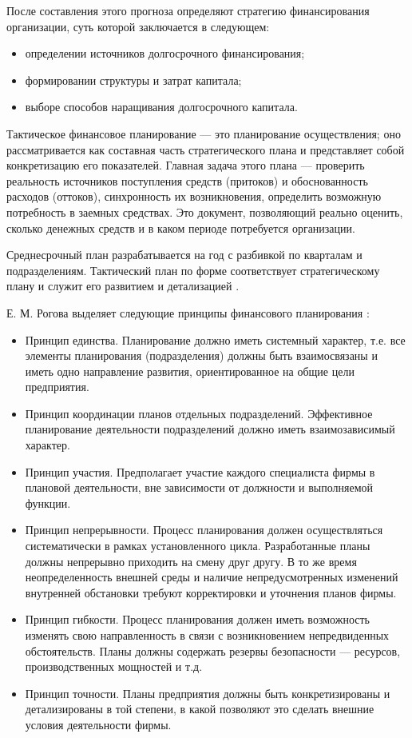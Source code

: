 После составления этого прогноза определяют стратегию финансирования организации, суть которой заключается в следующем:
\begin{itemize}
	\item определении источников долгосрочного финансирования;
	\item формировании структуры и затрат капитала;
	\item выборе способов наращивания долгосрочного капитала.
\end{itemize}

Тактическое финансовое планирование --- это планирование осуществления; оно рассматривается как составная часть стратегического плана и представляет собой конкретизацию его показателей.
Главная задача этого плана --- проверить реальность источников поступления средств (притоков) и обоснованность расходов (оттоков), синхронность их возникновения, определить возможную потребность в заемных средствах.
Это документ, позволяющий реально оценить, сколько денежных средств и в каком периоде потребуется организации.

Среднесрочный план разрабатывается на год с разбивкой по кварталам и подразделениям.
Тактический план по форме соответствует стратегическому плану и служит его развитием и детализацией \cite[179]{kirichenko}.

Е. М. Рогова выделяет следующие принципы финансового планирования \cite[70--72]{rogova}:
\begin{itemize}
	\item Принцип единства.
	Планирование должно иметь системный характер, т.е. все элементы планирования (подразделения) должны быть взаимосвязаны и иметь одно направление развития, ориентированное на общие цели предприятия.
	\item Принцип координации планов отдельных подразделений.
	Эффективное планирование деятельности подразделений должно иметь взаимозависимый характер.
	\item Принцип участия.
	Предполагает участие каждого специалиста фирмы в плановой деятельности, вне зависимости от должности и выполняемой функции.
	\item Принцип непрерывности.
	Процесс планирования должен осуществляться систематически в рамках установленного цикла.
	Разработанные планы должны непрерывно приходить на смену друг другу.
	В то же время неопределенность внешней среды и наличие непредусмотренных изменений внутренней обстановки требуют корректировки и уточнения планов фирмы.
	\item Принцип гибкости.
	Процесс планирования должен иметь возможность изменять свою направленность в связи с возникновением непредвиденных обстоятельств.
	Планы должны содержать резервы безопасности --- ресурсов, производственных мощностей и т.д.
	\item Принцип точности.
	Планы предприятия должны быть конкретизированы и детализированы в той степени, в какой позволяют это сделать внешние условия деятельности фирмы.
\end{itemize}

